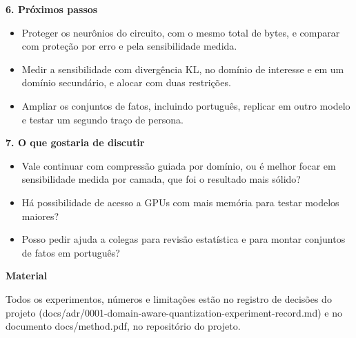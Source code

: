 \documentclass[11pt,a4paper]{article}
\newcommand{\secao}[1]{\par\textbf{#1}\par\nopagebreak[4]}
\begin{document}
\secao{6. Próximos passos}

\begin{itemize}
\item Proteger os neurônios do circuito, com o mesmo total de bytes, e comparar com proteção por erro e pela sensibilidade medida.
\item Medir a sensibilidade com divergência KL, no domínio de interesse e em um domínio secundário, e alocar com duas restrições.
\item Ampliar os conjuntos de fatos, incluindo português, replicar em outro modelo e testar um segundo traço de persona.
\end{itemize}

\secao{7. O que gostaria de discutir}

\begin{itemize}
\item Vale continuar com compressão guiada por domínio, ou é melhor focar em sensibilidade medida por camada, que foi o resultado mais sólido?
\item Há possibilidade de acesso a GPUs com mais memória para testar modelos maiores?
\item Posso pedir ajuda a colegas para revisão estatística e para montar conjuntos de fatos em português?
\end{itemize}

\secao{Material}

Todos os experimentos, números e limitações estão no registro de decisões do projeto (docs/adr/0001-domain-aware-quantization-experiment-record.md) e no documento docs/method.pdf, no repositório do projeto.
\end{document}
